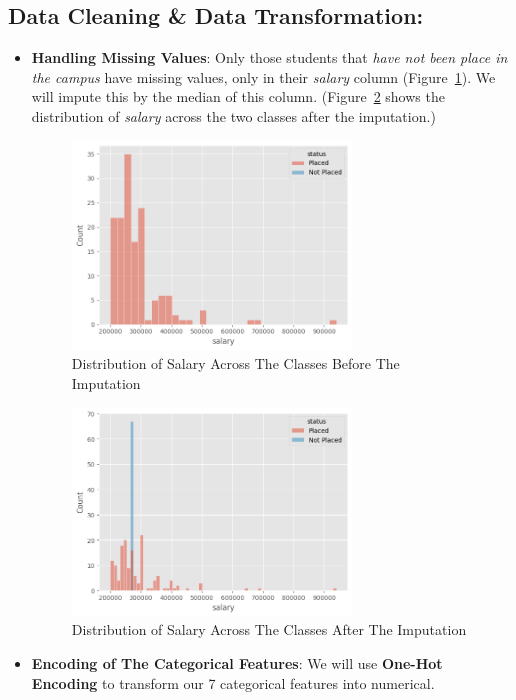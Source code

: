 \documentclass[a4paper,12pt]{article}
\begin{document}
\subsection{Data Cleaning \& Data Transformation:}
\begin{itemize}
    \item \textbf{Handling Missing Values}: Only those students that \textit{have not been place in the campus} have missing values, only in their \textit{salary} column (Figure~\ref{fig:fig_1}). 
    We will impute this by the median of this column. (Figure~\ref{fig:fig_2} shows the distribution of \textit{salary} across the two classes after the imputation.)
    \begin{figure}[H]
        \centering
        \includegraphics[width=0.7\textwidth]{./images/salary_dist_with_miss.png}
        \caption{Distribution of Salary Across The Classes Before The Imputation}
        \label{fig:fig_1}
    \end{figure}
    \begin{figure}[H]
        \centering
        \includegraphics[width=0.7\textwidth]{./images/salary_dist_without_miss.png}
        \caption{Distribution of Salary Across The Classes After The Imputation}
        \label{fig:fig_2}
    \end{figure}
    \item \textbf{Encoding of The Categorical Features}: We will use \textbf{One-Hot Encoding} to transform our 7 categorical features into numerical.
\end{itemize}
\end{document}
